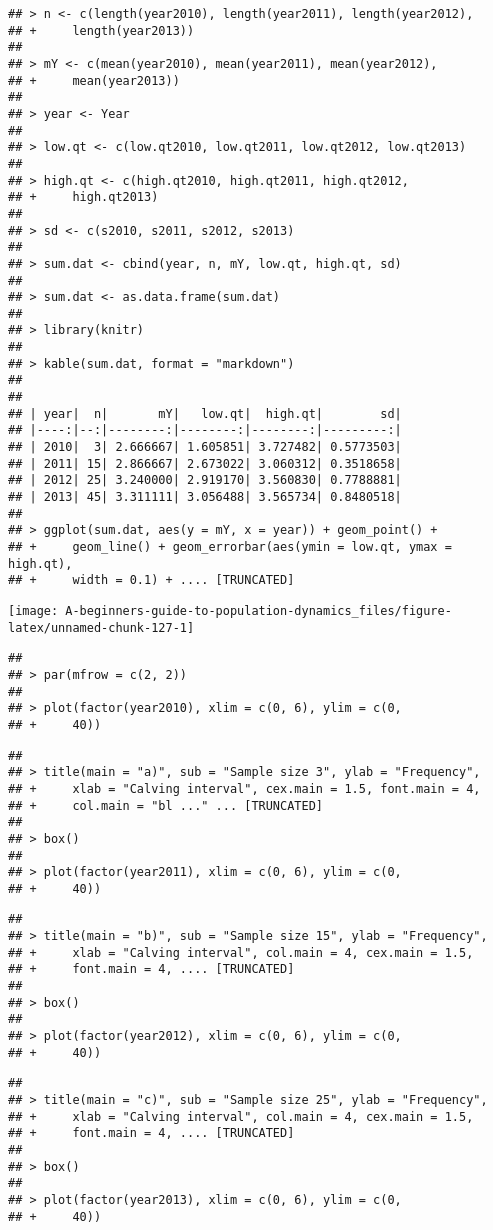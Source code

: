\documentclass[]{book}
\begin{document}
\begin{verbatim}
## > n <- c(length(year2010), length(year2011), length(year2012), 
## +     length(year2013))
## 
## > mY <- c(mean(year2010), mean(year2011), mean(year2012), 
## +     mean(year2013))
## 
## > year <- Year
## 
## > low.qt <- c(low.qt2010, low.qt2011, low.qt2012, low.qt2013)
## 
## > high.qt <- c(high.qt2010, high.qt2011, high.qt2012, 
## +     high.qt2013)
## 
## > sd <- c(s2010, s2011, s2012, s2013)
## 
## > sum.dat <- cbind(year, n, mY, low.qt, high.qt, sd)
## 
## > sum.dat <- as.data.frame(sum.dat)
## 
## > library(knitr)
## 
## > kable(sum.dat, format = "markdown")
## 
## 
## | year|  n|       mY|   low.qt|  high.qt|        sd|
## |----:|--:|--------:|--------:|--------:|---------:|
## | 2010|  3| 2.666667| 1.605851| 3.727482| 0.5773503|
## | 2011| 15| 2.866667| 2.673022| 3.060312| 0.3518658|
## | 2012| 25| 3.240000| 2.919170| 3.560830| 0.7788881|
## | 2013| 45| 3.311111| 3.056488| 3.565734| 0.8480518|
## 
## > ggplot(sum.dat, aes(y = mY, x = year)) + geom_point() + 
## +     geom_line() + geom_errorbar(aes(ymin = low.qt, ymax = high.qt), 
## +     width = 0.1) + .... [TRUNCATED]
\end{verbatim}

\begin{center}\texttt{[image: A-beginners-guide-to-population-dynamics\_files/figure-latex/unnamed-chunk-127-1]} \end{center}

\begin{verbatim}
## 
## > par(mfrow = c(2, 2))
## 
## > plot(factor(year2010), xlim = c(0, 6), ylim = c(0, 
## +     40))
\end{verbatim}

\begin{verbatim}
## 
## > title(main = "a)", sub = "Sample size 3", ylab = "Frequency", 
## +     xlab = "Calving interval", cex.main = 1.5, font.main = 4, 
## +     col.main = "bl ..." ... [TRUNCATED] 
## 
## > box()
## 
## > plot(factor(year2011), xlim = c(0, 6), ylim = c(0, 
## +     40))
\end{verbatim}

\begin{verbatim}
## 
## > title(main = "b)", sub = "Sample size 15", ylab = "Frequency", 
## +     xlab = "Calving interval", col.main = 4, cex.main = 1.5, 
## +     font.main = 4, .... [TRUNCATED] 
## 
## > box()
## 
## > plot(factor(year2012), xlim = c(0, 6), ylim = c(0, 
## +     40))
\end{verbatim}

\begin{verbatim}
## 
## > title(main = "c)", sub = "Sample size 25", ylab = "Frequency", 
## +     xlab = "Calving interval", col.main = 4, cex.main = 1.5, 
## +     font.main = 4, .... [TRUNCATED] 
## 
## > box()
## 
## > plot(factor(year2013), xlim = c(0, 6), ylim = c(0, 
## +     40))
\end{verbatim}
\end{document}
